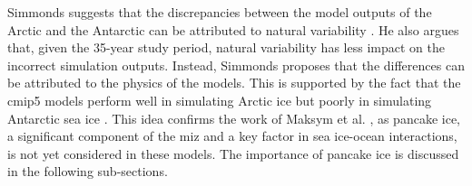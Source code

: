 Simmonds suggests that the discrepancies between the model outputs of the Arctic and the Antarctic can be attributed to natural variability \cite{Simmonds2015}. He also argues that, given the 35-year study period, natural variability has less impact on the incorrect simulation outputs. Instead, Simmonds proposes that the differences can be attributed to the physics of the models. This is supported by the fact that the \acs{cmip5} models perform well in simulating Arctic ice but poorly in simulating Antarctic sea ice \cite{Simmonds2015}. This idea confirms the work of Maksym et al. \cite{Maksym2012}, as pancake ice, a significant component of the \acs{miz} and a key factor in sea ice-ocean interactions, is not yet considered in these models. The importance of pancake ice is discussed in the following sub-sections.


